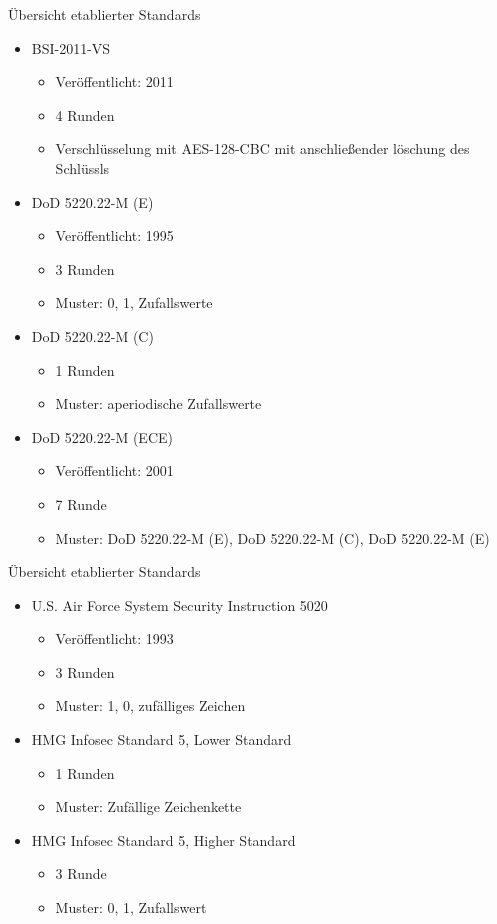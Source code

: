 \documentclass{beamer}
\begin{document}
\begin{frame}{Übersicht etablierter Standards}
	\begin{itemize}
		\item BSI-2011-VS	
			\begin{itemize}
				\item Veröffentlicht: 2011
				\item 4 Runden
				\item Verschlüsselung mit AES-128-CBC mit anschließender
					löschung des Schlüssls
			\end{itemize}
		\item DoD 5220.22-M (E)
			\begin{itemize}
				\item Veröffentlicht: 1995
				\item 3 Runden
				\item Muster: 0, 1, Zufallswerte
			\end{itemize}
		\item DoD 5220.22-M (C)
			\begin{itemize}
				\item 1 Runden
				\item Muster: aperiodische Zufallswerte
			\end{itemize}
		\item DoD 5220.22-M (ECE)
			\begin{itemize}
				\item Veröffentlicht: 2001
				\item 7 Runde
				\item Muster: DoD 5220.22-M (E), DoD 5220.22-M (C),
					DoD 5220.22-M (E)
			\end{itemize}
	\end{itemize}
\end{frame}

\begin{frame}{Übersicht etablierter Standards}
	\begin{itemize}
		\item U.S. Air Force System Security Instruction 5020
			\begin{itemize}
				\item Veröffentlicht: 1993
				\item 3 Runden
				\item Muster: 1, 0, zufälliges Zeichen
			\end{itemize}
		\item HMG Infosec Standard 5, Lower Standard	
			\begin{itemize}
				\item 1 Runden
				\item Muster: Zufällige Zeichenkette
			\end{itemize}
		\item HMG Infosec Standard 5, Higher Standard	
			\begin{itemize}
				\item 3 Runde
				\item Muster: 0, 1, Zufallswert
			\end{itemize}
	\end{itemize}
\end{frame}
\end{document}

